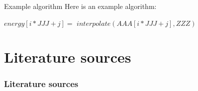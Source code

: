 \documentclass[12pt]{beamer}
\begin{document}
\begin{frame}{Example algorithm}
    Here is an example algorithm:
    \begin{algorithm}[H]
    \begin{algorithmic}[1]
    \STATE $energy[i*JJJ+j] =$ 
    $ interpolate(AAA[i*JJJ+j], ZZZ)$
    \ENDFOR
    \ENDFOR
    \end{algorithmic}
    \caption{pseudocode for the calculation of}
    \label{alg:seq}
    \end{algorithm}
\end{frame}

\section{Literature sources}
\begin{frame}[t,allowframebreaks]
    \frametitle{Literature sources}
    \printbibliography
\end{frame}
\end{document}
